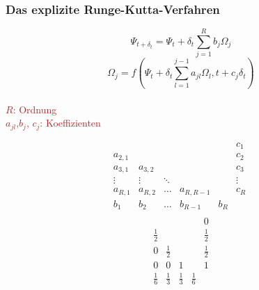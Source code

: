 \documentclass{beamer}
\begin{document}
\begin{frame}
\frametitle{Das explizite Runge-Kutta-Verfahren}
{\begin{equation*}
\Psi_{t + \delta_t} = \Psi_t + \delta_t \sum_{j = 1}^{R} b_j \Omega_j
\end{equation*}
\begin{equation*}
\Omega_j = f(\Psi_t + \delta_t\sum_{l = 1}^{j - 1}a_{jl}\Omega_l, t + c_j \delta_t)
\end{equation*}}
\\
\textcolor{brown}{
	\(R\): Ordnung\\
	\(a_{j l}\),\(b_j\), \(c_j\): Koeffizienten
}
\begin{multicols}{2}
	\pause
	\begin{equation*}
	\begin{array}{ccccc|c}
	& 		&  		&  		&  		& c_1\\
	a_{2,1} & 		&  		&  		&  		& c_2\\
	a_{3,1} &a_{3,2}& 		&  		&  		& c_3\\
	\vdots 	&\vdots	&\ddots	&  		&  		& \vdots\\
	a_{R,1}	&a_{R,2}&\dots	&a_{R,R-1}&  	& c_R\\
	\hline  
	b_1    & b_2   	& \dots &b_{R-1}& b_R	&\\
	\end{array}\; 
	\label{runge_tabelle}
	\end{equation*}
	\pause
	\begin{equation*}
	\label{runge_tabelle}
	\begin{array}{cccc|c}
	& 		&  		&  		& 0\\
	\frac{1}{2} & 	& 		&  		& \frac{1}{2}\\
	0 	& \frac{1}{2}	&  & & \frac{1}{2}\\
	0& 0	& 1 & & 1\\
	\hline  
	\frac{1}{6}    	& \frac{1}{3}  	& \frac{1}{3} & \frac{1}{6} 	& \\
	\end{array}
	\end{equation*}
\end{multicols}


\end{frame}
\end{document}
